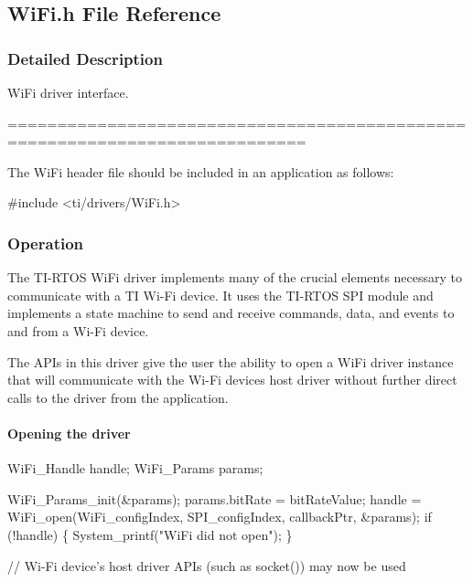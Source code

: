 \subsection{Wi\+Fi.\+h File Reference}
\label{_wi_fi_8h}


\subsubsection{Detailed Description}
Wi\+Fi driver interface. 

============================================================================

The Wi\+Fi header file should be included in an application as follows\+: 
\begin{DoxyCode}
\textcolor{preprocessor}{#include <ti/drivers/WiFi.h>}
\end{DoxyCode}


\subsubsection*{Operation}

The T\+I-\/\+R\+T\+O\+S Wi\+Fi driver implements many of the crucial elements necessary to communicate with a T\+I Wi-\/\+Fi device. It uses the T\+I-\/\+R\+T\+O\+S S\+P\+I module and implements a state machine to send and receive commands, data, and events to and from a Wi-\/\+Fi device.

The A\+P\+Is in this driver give the user the ability to open a Wi\+Fi driver instance that will communicate with the Wi-\/\+Fi device\textquotesingle{}s host driver without further direct calls to the driver from the application.

\paragraph*{Opening the driver}


\begin{DoxyCode}
WiFi_Handle      handle;
WiFi_Params      params;

WiFi_Params_init(&params);
params.bitRate  = bitRateValue;
handle = WiFi_open(WiFi\_configIndex, SPI\_configIndex, callbackPtr,
                   &params);
\textcolor{keywordflow}{if} (!handle) \{
    System\_printf(\textcolor{stringliteral}{"WiFi did not open"});
\}

\textcolor{comment}{// Wi-Fi device's host driver APIs (such as socket()) may now be used}
\end{DoxyCode}



